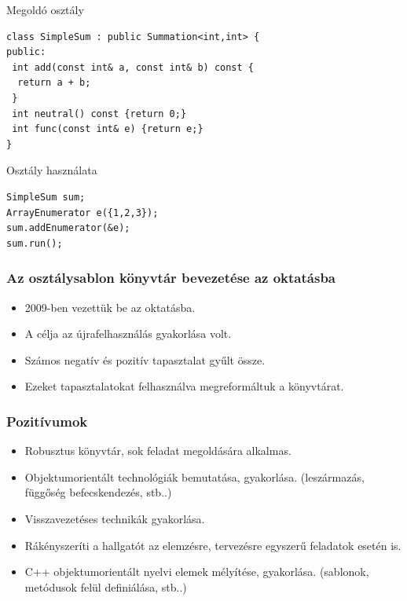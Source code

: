 \documentclass[11pt]{beamer}
\begin{document}
\begin{frame}[fragile]	
	\begin{block}{Megoldó osztály}
		\begin{lstlisting}[basicstyle=\small]
class SimpleSum : public Summation<int,int> {
public:
 int add(const int& a, const int& b) const {
  return a + b;
 }
 int neutral() const {return 0;}
 int func(const int& e) {return e;}
}
		\end{lstlisting}
	\end{block}
	
	\begin{block}{Osztály használata}
	  	\begin{lstlisting}[basicstyle=\small]
SimpleSum sum;
ArrayEnumerator e({1,2,3});
sum.addEnumerator(&e);
sum.run();
		\end{lstlisting}
	\end{block}
\end{frame}

\begin{frame}
	\frametitle{Az osztálysablon könyvtár bevezetése az oktatásba}
	\begin{itemize}
		\item 2009-ben vezettük be az oktatásba.
		\vspace*{2px}
		\item A célja az újrafelhasználás gyakorlása volt.
		\vspace*{2px}
		\item Számos negatív és pozitív tapasztalat gyűlt össze.
		\vspace*{2px}
		\item Ezeket tapasztalatokat felhasználva megreformáltuk a könyvtárat.
	\end{itemize}
\end{frame}

\begin{frame}
	\frametitle{Pozitívumok}
	\begin{itemize}
		\item Robusztus könyvtár, sok feladat megoldására alkalmas.
		\item Objektumorientált technológiák bemutatása, gyakorlása. (leszármazás, függőség befecskendezés, stb..) 
		\vspace*{8px}
		\item Visszavezetéses technikák gyakorlása.
		\vspace*{8px}
		\item Rákényszeríti a hallgatót az elemzésre, tervezésre egyszerű feladatok esetén is.
		\item C++ objektumorientált nyelvi elemek mélyítése, gyakorlása. (sablonok, metódusok felül definiálása, stb..)
		
	\end{itemize}
\end{frame}
\end{document}
